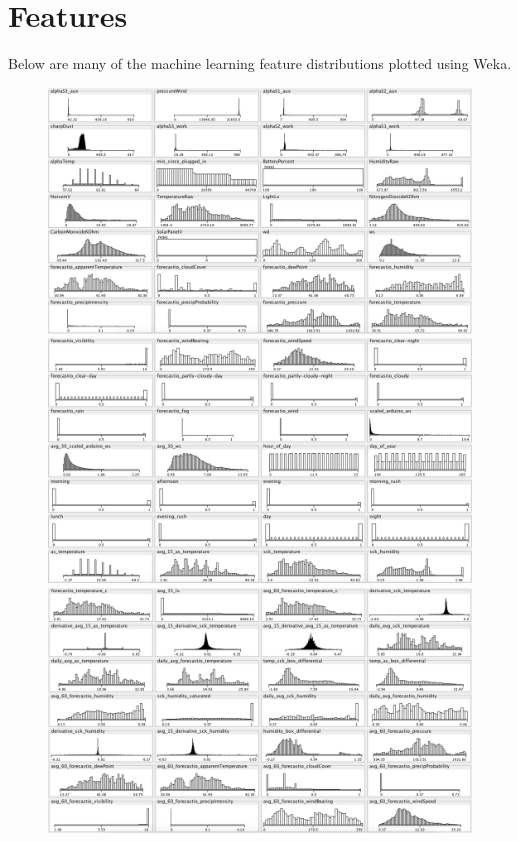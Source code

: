 \FloatBarrier
\section{Features}
\FloatBarrier

Below are many of the machine learning feature distributions plotted using Weka.

\begin{figure}[htb]
 	\includegraphics[width=\textwidth]{weka/features1}  
	\includegraphics[width=\textwidth]{weka/features2}  
	\includegraphics[width=\textwidth]{weka/features3}  

\end{figure}
